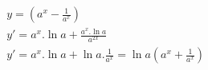 \begin{ex}
\begin{align}
&y=\left(a^x-\frac{1}{a^x}\right)\nonumber\\
&y'=a^x.\ln{a}+\frac{a^x.\ln{a}}{a^{2x}}\nonumber\\
&y'=a^x.\ln{a}+\ln{a}.\frac{1}{a^x}=\ln{a}\left(a^x+\frac{1}{a^x}\right)\nonumber
\end{align}
\end{ex}